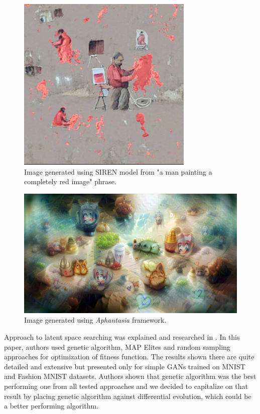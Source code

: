 \documentclass[12pt,a4paper,openany]{book}
\begin{document}
\begin{figure}[H]
    \centering
    \includegraphics[scale=1.0]{figs/deepdaze.png}
    \caption{Image generated using SIREN \cite{siren} model from "a man painting a \\ completely red image" phrase.}\label{Fig:deepdaze}
\end{figure}

\begin{figure}[H]
    \centering
    \includegraphics[scale=0.5]{figs/aphantasia.png}
    \caption{Image generated using \textit{Aphantasia} \cite{aphantasia} framework.}\label{Fig:Aphantasia}
\end{figure}

\noindent Approach to latent space searching was explained and researched in \cite{coimbra}. In this paper, authors used genetic algorithm, MAP Elites and random sampling approaches for optimization of fitness function. The results shown there are quite detailed and extensive but presented only for simple GANs trained on MNIST and Fashion MNIST datasets. Authors shown that genetic algorithm was the best performing one from all tested approaches and we decided to capitalize on that result by placing genetic algorithm against differential evolution, which could be a better performing algorithm.
\end{document}
